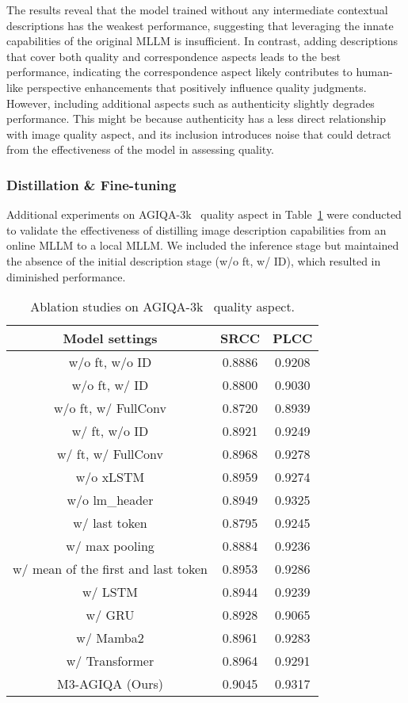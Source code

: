 The results reveal that the model trained without any intermediate contextual descriptions has the weakest performance, suggesting that leveraging the innate capabilities of the original MLLM is insufficient.
In contrast, adding descriptions that cover both quality and correspondence aspects leads to the best performance, indicating the correspondence aspect likely contributes to human-like perspective enhancements that positively influence quality judgments.
However, including additional aspects such as authenticity slightly degrades performance. 
This might be because authenticity has a less direct relationship with image quality aspect, and its inclusion introduces noise that could detract from the effectiveness of the model in assessing quality.

\subsubsection{Distillation \& Fine-tuning}
Additional experiments on AGIQA-3k~\cite{li2023agiqa} quality aspect in Table~\ref{tab:ab2} were conducted to validate the effectiveness of distilling image description capabilities from an online MLLM to a local MLLM.
We included the inference stage but maintained the absence of the initial description stage (w/o ft, w/ ID), which resulted in diminished performance.


\begin{table}
    \centering
    \caption{Ablation studies on AGIQA-3k~\cite{li2023agiqa} quality aspect.}
    \label{tab:ab2}
    \begin{tabular}{c| cc}
        \toprule
        Model settings & SRCC & PLCC  \\
        \midrule
        w/o ft, w/o ID & 0.8886 & 0.9208 \\
        w/o ft, w/ ID & 0.8800 & 0.9030 \\
        w/o ft, w/ FullConv & 0.8720 & 0.8939 \\
        w/ ft, w/o ID & 0.8921 & 0.9249 \\
        w/ ft, w/ FullConv & 0.8968 & 0.9278 \\
        \midrule
        w/o xLSTM & 0.8959 & 0.9274 \\
        w/o lm\_header & 0.8949 & 0.9325 \\
        \midrule
        w/ last token & 0.8795 & 0.9245 \\
        w/ max pooling & 0.8884 & 0.9236 \\
        w/ mean of the first and last token & 0.8953 & 0.9286\\
        \midrule
        w/ LSTM & 0.8944 & 0.9239 \\
        w/ GRU & 0.8928 & 0.9065 \\
        w/ Mamba2 & 0.8961 & 0.9283 \\
        w/ Transformer & 0.8964 & 0.9291 \\
        \midrule
        
        M3-AGIQA (Ours) & 0.9045 & 0.9317 \\
        \bottomrule
    \end{tabular}
\end{table}

